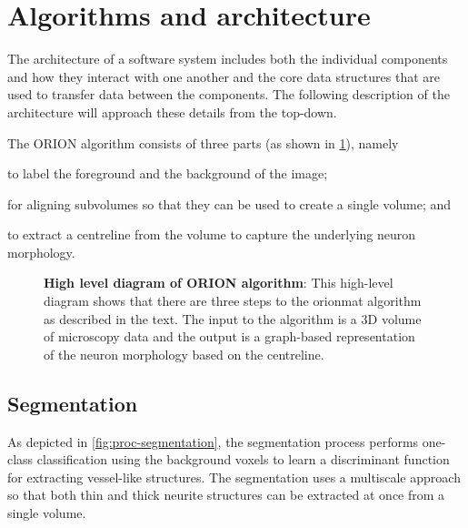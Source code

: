 \section{Algorithms and architecture}

The architecture of a software system includes both the individual
components and how they interact with one another and the core
data structures that are used to transfer data between the
components. The following description of the architecture will
approach these details from the top-down.

The ORION algorithm consists of three parts (as shown in \cref{fig:high-level-arch}),
namely
\begin{description}[font=\textpluscolon]
	\item[Segmentation] to label the
		foreground and the background of the image;
	\item[Registration] for aligning subvolumes so
		that they can be used to create a single volume;
		and
	\item[Tracing] to extract a centreline from the volume to
		capture the underlying neuron morphology.
\end{description}

\begin{figure}
\centering
\resizebox{1.0\textwidth}{!}{}
\caption[High level diagram of ORION algorithm]{\textbf{High level
diagram of ORION algorithm}: This high-level diagram shows that
there are three steps to the \gls{orionmat} algorithm as described
in the text. The input to the algorithm is a 3D volume of
microscopy data and the output is a graph-based representation of
the neuron morphology based on the centreline.}\label{fig:high-level-arch}
\end{figure}

\subsection{Segmentation}

As depicted in \cref{fig:proc-segmentation}, the
segmentation process performs one-class classification using the
background voxels to learn a discriminant function for extracting
vessel-like structures. The segmentation uses a multiscale approach so that
both thin and thick neurite structures can be extracted at once from a single
volume.


